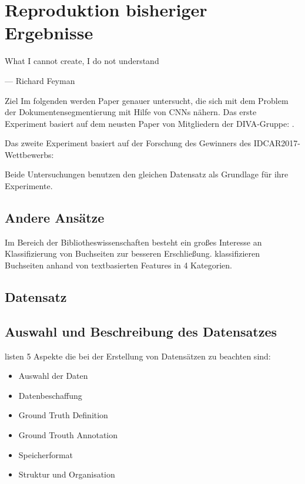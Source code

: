 \chapter{Reproduktion bisheriger Ergebnisse}
\label{chap:reproduktion}
\epigraph{What I cannot create, I do not understand}{--- Richard Feyman}

Ziel 
Im folgenden werden Paper genauer untersucht, die sich mit dem Problem der Dokumentensegmentierung mit Hilfe von CNNs nähern.
Das erste Experiment basiert auf dem neusten Paper von Mitgliedern der DIVA-Gruppe: \citeauthor*{ChenConvolutionalNeuralNetworks2017}. 

Das zweite Experiment basiert auf der Forschung des Gewinners des IDCAR2017-Wettbewerbs: \citeauthor*{XuPageSegmentationHistorical2017} 

Beide Untersuchungen benutzen den gleichen Datensatz als Grundlage für ihre Experimente. 
\section{Andere Ansätze}
\cite{WickFullyConvolutionalNeural2017}
Im Bereich der Bibliotheswissenschaften besteht ein großes Interesse an Klassifizierung von
Buchseiten zur besseren Erschließung.
\cite{McConnaugheyLabeledSegmentationPrinted2017} klassifizieren Buchseiten anhand von textbasierten Features in 4 Kategorien. 




\section{Datensatz}

\section{Auswahl und Beschreibung des Datensatzes}
\textcite[985\psqq]{DoermannHandbookdocumentimage2014} listen 5 Aspekte die bei der Erstellung von Datensätzen zu beachten sind:
\begin{itemize}
    \item Auswahl der Daten
    \item Datenbeschaffung
    \item Ground Truth Definition
    \item Ground Trouth Annotation
    \item Speicherformat
    \item Struktur und Organisation
\end{itemize}

